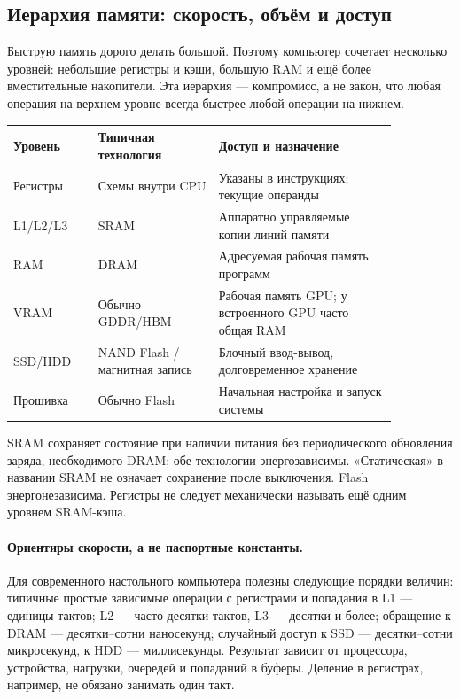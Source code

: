 \subsection{Иерархия памяти: скорость, объём и доступ}
\label{lecture04-memory}
Быструю память дорого делать большой. Поэтому компьютер сочетает несколько
уровней: небольшие регистры и кэши, большую RAM и ещё более вместительные
накопители. Эта иерархия --- компромисс, а не закон, что любая операция
на верхнем уровне всегда быстрее любой операции на нижнем.

\begin{center}
\small
\begin{tabular}{|p{0.19\linewidth}|p{0.27\linewidth}|p{0.4\linewidth}|}
\hline
Уровень & Типичная технология & Доступ и назначение \\
\hline
Регистры & Схемы внутри CPU & Указаны в инструкциях; текущие операнды \\
L1/L2/L3 & SRAM & Аппаратно управляемые копии линий памяти \\
RAM & DRAM & Адресуемая рабочая память программ \\
VRAM & Обычно GDDR/HBM & Рабочая память GPU; у встроенного GPU часто общая RAM \\
SSD/HDD & NAND Flash / магнитная запись & Блочный ввод-вывод, долговременное хранение \\
Прошивка & Обычно Flash & Начальная настройка и запуск системы \\
\hline
\end{tabular}
\end{center}

SRAM сохраняет состояние при наличии питания без периодического обновления
заряда, необходимого DRAM; обе технологии энергозависимы. «Статическая»
в названии SRAM не означает сохранение после выключения. Flash энергонезависима.
Регистры не следует механически называть ещё одним уровнем SRAM-кэша.

\paragraph{Ориентиры скорости, а не паспортные константы.}
Для современного настольного компьютера полезны следующие порядки величин:
типичные простые зависимые операции с регистрами и попадания в L1 ---
единицы тактов; L2 --- часто десятки тактов, L3 --- десятки и более;
обращение к DRAM --- десятки--сотни наносекунд; случайный доступ к SSD ---
десятки--сотни микросекунд, к HDD --- миллисекунды. Результат зависит от
процессора, устройства, нагрузки, очередей и попаданий в буферы.
Деление в регистрах, например, не обязано занимать один такт.

